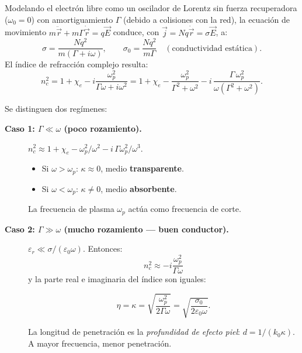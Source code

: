 \documentclass[12pt, a4paper]{article}
\theoremstyle{plain}
\theoremstyle{definition}
\theoremstyle{remark}
\newcommand{\ve}[1]{\vec{#1}}
\begin{document}
Modelando el electrón libre como un oscilador de Lorentz sin fuerza recuperadora
($\omega_0 = 0$) con amortiguamiento $\Gamma$ (debido a colisiones con la red),
la ecuación de movimiento $m\ddot{\ve{r}}+m\Gamma\dot{\ve{r}} = q\ve{E}$
conduce, con $\ve{j} = Nq\dot{\ve{r}} = \sigma\ve{E}$, a:
\[
  \sigma = \frac{Nq^2}{m(\Gamma + i\omega)}, \qquad
  \sigma_0 = \frac{Nq^2}{m\Gamma} \quad(\text{conductividad estática}).
\]
El índice de refracción complejo resulta:
\begin{equation}
  n_c^2 = 1 + \chi_e - i\frac{\omega_p^2}{\Gamma\omega + i\omega^2}
        = 1 + \chi_e
          - \frac{\omega_p^2}{\Gamma^2+\omega^2}
          - i\,\frac{\Gamma\,\omega_p^2}{\omega(\Gamma^2+\omega^2)}.
  \label{eq:nc_conductor}
\end{equation}

\medskip
Se distinguen dos regímenes:

\medskip
\begin{description}
  \item[\textbf{Caso 1: $\Gamma\ll\omega$ (poco rozamiento).}]
        $n_c^2 \approx 1+\chi_e - \omega_p^2/\omega^2
        - i\,\Gamma\omega_p^2/\omega^3$.
        \begin{itemize}
          \item Si $\omega>\omega_p$: $\kappa\approx 0$, medio \textbf{transparente}.
          \item Si $\omega<\omega_p$: $\kappa\neq 0$, medio \textbf{absorbente}.
        \end{itemize}
        La frecuencia de plasma $\omega_p$ actúa como frecuencia de corte.

  \item[\textbf{Caso 2: $\Gamma\gg\omega$ (mucho rozamiento — buen conductor).}]
        $\varepsilon_r \ll \sigma/(\varepsilon_0\omega)$. Entonces:
        \[
          n_c^2 \approx -i\frac{\omega_p^2}{\Gamma\omega}
        \]
        y la parte real e imaginaria del índice son iguales:
        \begin{mdframed}[style=resultado]
        \begin{equation}
          \eta = \kappa = \sqrt{\frac{\omega_p^2}{2\Gamma\omega}}
               = \sqrt{\frac{\sigma_0}{2\varepsilon_0\omega}}.
          \label{eq:conductor_grueso}
        \end{equation}
        \end{mdframed}
        La longitud de penetración es la \emph{profundidad de efecto piel}:
        $d = 1/(k_0\kappa)$. A mayor frecuencia, menor penetración.
\end{description}
\end{document}

